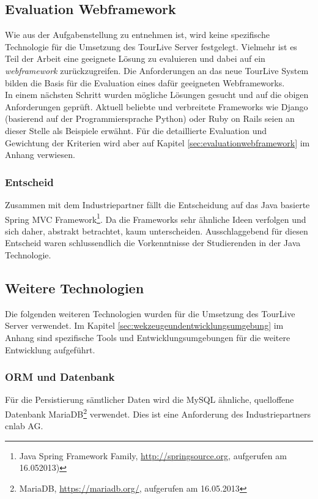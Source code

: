 \subsection{Evaluation Webframework}
\label{sec:tourliveserverevaluationwebframework}
Wie aus der Aufgabenstellung zu entnehmen ist, wird keine spezifische Technologie für die Umsetzung des TourLive Server festgelegt. Vielmehr ist es Teil der Arbeit eine geeignete Lösung zu evaluieren und dabei auf ein \textit{\gls{webframework}} zurückzugreifen.
Die Anforderungen an das neue TourLive System bilden die Basis für die Evaluation eines dafür geeigneten Webframeworks.
\\

In einem nächsten Schritt wurden mögliche Lösungen gesucht und auf die obigen Anforderungen geprüft. Aktuell beliebte und verbreitete Frameworks wie Django (basierend auf der Programmiersprache Python) oder Ruby on Rails seien an dieser Stelle als Beispiele erwähnt. Für die detaillierte Evaluation und Gewichtung der Kriterien wird aber auf Kapitel \ref{sec:evaluationwebframework} im Anhang verwiesen.

\subsubsection{Entscheid}
Zusammen mit dem Industriepartner fällt die Entscheidung auf das Java basierte Spring MVC Framework\footnote{Java Spring Framework Family, \url{http://springsource.org}, aufgerufen am 16.052013)}. Da die Frameworks sehr ähnliche Ideen verfolgen und sich daher, abstrakt betrachtet, kaum unterscheiden. Ausschlaggebend für diesen Entscheid waren schlussendlich die Vorkenntnisse der Studierenden in der Java Technologie. 

\subsection{Weitere Technologien}
Die folgenden weiteren Technologien wurden für die Umsetzung des TourLive Server verwendet. Im Kapitel \ref{sec:wekzeugeundentwicklungsumgebung} im Anhang sind spezifische Tools und Entwicklungsumgebungen für die weitere Entwicklung aufgeführt.

\subsubsection{ORM und Datenbank}
Für die Persistierung sämtlicher Daten wird die MySQL ähnliche, quelloffene Datenbank MariaDB\footnote{MariaDB, \url{https://mariadb.org/}, aufgerufen am 16.05.2013} verwendet. Dies ist eine Anforderung des Industriepartners cnlab AG.
\\


